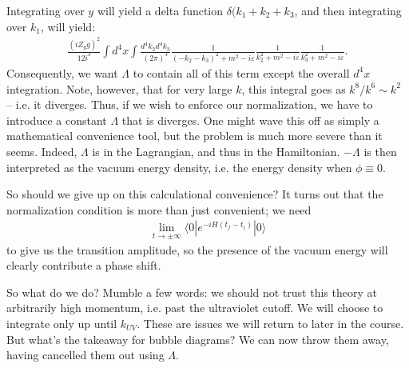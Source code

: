 \documentclass{../mathnotes}
\begin{document}
Integrating over $y$ will yield a delta function $\delta(k_1+k_2+k_3$, and then integrating over $k_1$, will yield:
\begin{align*}
    \frac{(iZ_gg)^2}{12i^3}\int d^4x\int\frac{d^4k_2d^4k_3}{(2\pi)^3}\frac{1}{(-k_2-k_3)^2+m^2-i\varepsilon}\frac{1}{k_2^2+m^2-i\varepsilon}\frac{1}{k_3^2+m^2-i\varepsilon}.
\end{align*}
Consequently, we want $\Lambda$ to contain all of this term except the overall $d^4x$ integration. Note, however, that for very
large $k$, this integral goes as $k^8/k^6\sim k^2$ -- i.e. it diverges. Thus, if we wish to enforce our normalization, we have to introduce
a constant $\Lambda$ that is diverges. One might wave this off as simply a mathematical convenience tool, but the problem is much more severe
than it seems. Indeed, $\Lambda$ is in the Lagrangian, and thus in the Hamiltonian. $-\Lambda$ is then interpreted as the vacuum energy density,
i.e. the energy density when $\phi\equiv 0$.

So should we give up on this calculational convenience? It turns out that the normalization condition is more than just convenient;
we need
\begin{align*}
    \lim_{t\to\pm\infty}\langle 0|e^{-iH(t_f-t_i)}|0\rangle
\end{align*}
to give us the transition amplitude, so the presence of the vacuum energy will clearly contribute a phase shift.

So what do we do? Mumble a few words: we should not trust this theory at arbitrarily high momentum, i.e. past the ultraviolet cutoff.
We will choose to integrate only up until $k_{UV}$.
These are issues we will return to later in the course. But what's the takeaway for bubble diagrams? We can now throw them away, having
cancelled them out using $\Lambda$.
\end{document}
